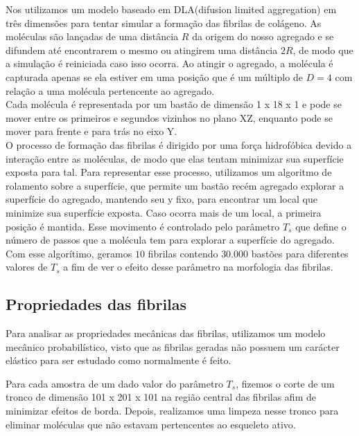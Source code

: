 \documentclass{article}
\begin{document}
Nos utilizamos um modelo baseado em DLA(difusion limited aggregation)\cite{Witten1983} em três dimensões para tentar simular a formação das fibrilas de colágeno. As moléculas são lançadas de uma distância $R$ da origem do nosso agregado e se difundem até encontrarem o mesmo ou atingirem uma distância  $2R$, de modo que a simulação é reiniciada caso isso ocorra. Ao atingir o agregado, a molécula é capturada apenas se ela estiver em uma posição que é um múltiplo de $D = 4$ com relação a uma molécula pertencente ao agregado\cite{Parkinson1995}. 
\\

Cada molécula é representada por um bastão de dimensão 1 x 18 x 1 e pode se mover entre os primeiros e segundos vizinhos no plano XZ, enquanto pode se mover para frente e para trás no eixo Y.
\\


O processo de formação das fibrilas é dirigido por uma força hidrofóbica devido a interação entre as moléculas, de modo que elas tentam minimizar sua superfície exposta para tal\cite{Kadler1987, Parkinson1995}. Para representar esse processo, utilizamos um algoritmo de rolamento sobre a superfície, que permite um bastão recém agregado explorar a superfície do agregado, mantendo seu y fixo, para encontrar um local que minimize sua superfície exposta\cite{GarcaRuiz1991}. Caso ocorra mais de um local, a primeira posição é mantida. Esse movimento é controlado pelo parâmetro $T_{s}$ que define o número de passos que a molécula tem para explorar a superfície do agregado\cite{Parkinson1995}.
\\

Com esse algorítimo, geramos $10$ fibrilas contendo $30.000$ bastões para diferentes valores de $T_{s}$ a fim de ver o efeito desse parâmetro na morfologia das fibrilas. 


\subsection{Propriedades das fibrilas}

Para analisar as propriedades mecânicas das fibrilas, utilizamos um modelo mecânico probabilístico, visto que as fibrilas geradas não possuem um carácter elástico para ser estudado como normalmente é feito\cite{Parkinson1997}. 

Para cada  amostra de um dado valor do parâmetro $T_{s}$, fizemos o corte de um tronco de dimensão 101 x 201 x 101 na região central das fibrilas afim de minimizar efeitos de borda. Depois, realizamos uma limpeza nesse tronco para eliminar moléculas que não estavam pertencentes ao esqueleto ativo\cite{Parkinson1997}.
\end{document}
